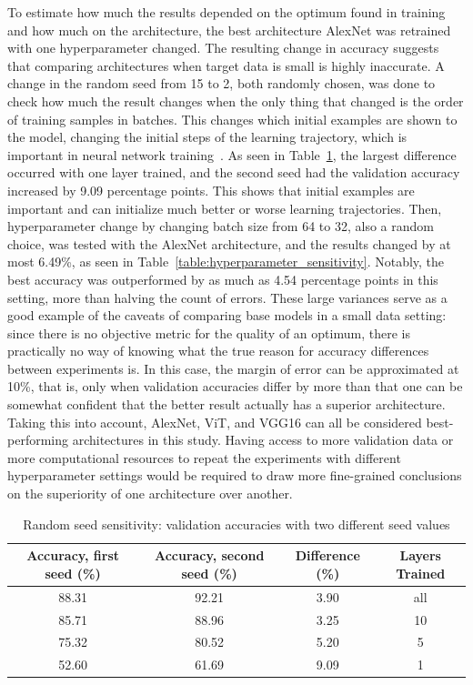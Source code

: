 \documentclass[english,twoside,openright]{UH_DS_MSc}
\begin{document}
To estimate how much the results depended on the optimum found in training and how much on the architecture, 
the best architecture AlexNet was retrained with one hyperparameter changed. The resulting 
change in accuracy suggests that comparing architectures when target data is small is highly inaccurate. 
A change in the random seed from 15 to 2, both randomly chosen, was done to check how much the result changes 
when the only thing that changed is the order of training samples in batches. This changes which initial examples are shown to the model,
changing the initial steps of the learning trajectory, which is important in neural network training~\cite{transferlearning_survey}.
 As seen in Table~\ref{table:random_seed_sensitivity}, the largest difference occurred with one layer 
trained, and the second seed had the validation accuracy increased by 9.09 percentage points. This shows that initial examples 
are important and can initialize much better or worse learning trajectories. Then, hyperparameter change 
by changing batch size from 64 to 32, also a random choice, was tested with the AlexNet architecture, and the results 
changed by at most 6.49\%, as seen in Table~\ref{table:hyperparameter_sensitivity}. Notably, the best accuracy was outperformed by as much as 4.54 percentage points 
in this setting, more than halving the count of errors. These large variances serve as a good example of the caveats of comparing 
base models in a small data setting: since there is no objective metric for the quality of an optimum, there 
is practically no way of knowing what the true reason for accuracy differences between experiments is. In this case, the 
margin of error can be approximated at 10\%, that is, only when validation accuracies differ by more than that one can be 
somewhat confident that the better result actually has a superior architecture. Taking this into account, AlexNet, ViT, and VGG16 
can all be considered best-performing architectures in this study. Having access to more validation data or more computational 
resources to repeat the experiments with different hyperparameter settings would be required to draw more fine-grained conclusions on the 
superiority of one architecture over another.

\begin{table}[ht]
    \centering
        \scriptsize
        \begin{tabular}{|c|c|c|c|}
            \hline
            \textbf{Accuracy, first seed (\%)} & \textbf{Accuracy, second seed (\%)} & \textbf{Difference (\%)} & \textbf{Layers Trained} \\ \hline
            88.31 & 92.21 & 3.90  & all \\\hline
            85.71 & 88.96 & 3.25 & 10  \\\hline
            75.32 & 80.52 & 5.20  & 5   \\\hline
            52.60 & 61.69 & 9.09 & 1   \\\hline
        \end{tabular}
    \caption{Random seed sensitivity: validation accuracies with two different seed values}
    \label{table:random_seed_sensitivity}
\end{table}
\end{document}
